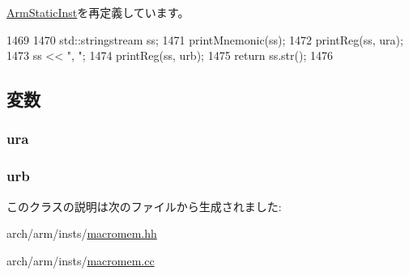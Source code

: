 \hyperlink{classArmISA_1_1ArmStaticInst_a95d323a22a5f07e14d6b4c9385a91896}{ArmStaticInst}を再定義しています。


\begin{DoxyCode}
1469 {
1470     std::stringstream ss;
1471     printMnemonic(ss);
1472     printReg(ss, ura);
1473     ss << ", ";
1474     printReg(ss, urb);
1475     return ss.str();
1476 }
\end{DoxyCode}


\subsection{変数}
\hypertarget{classArmISA_1_1MicroIntMov_a8e6cd3e234a4950e7a1a05f1b24cfee0}{
\subsubsection[{ura}]{ {\bf ura}}}
\label{classArmISA_1_1MicroIntMov_a8e6cd3e234a4950e7a1a05f1b24cfee0}
\hypertarget{classArmISA_1_1MicroIntMov_a3771d4e6da84a09dbf436d6b1af2be46}{
\subsubsection[{urb}]{ {\bf urb}}}
\label{classArmISA_1_1MicroIntMov_a3771d4e6da84a09dbf436d6b1af2be46}


このクラスの説明は次のファイルから生成されました:\begin{DoxyCompactItemize}
\item 
arch/arm/insts/\hyperlink{macromem_8hh}{macromem.hh}\item 
arch/arm/insts/\hyperlink{macromem_8cc}{macromem.cc}\end{DoxyCompactItemize}
